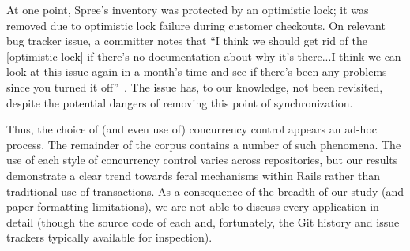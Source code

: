 At one point, Spree's inventory was protected by an optimistic lock;
it was removed due to optimistic lock failure during customer
checkouts. On relevant bug tracker issue, a committer notes that ``I
think we should get rid of the [optimistic lock] if there's no
documentation about why it's there...I think we can look at this issue
again in a month's time and see if there's been any problems since you
turned it off''~\cite{code-optimistic-issue}. The issue has, to our
knowledge, not been revisited, despite the potential dangers of
removing this point of synchronization.

Thus, the choice of (and even use of) concurrency control appears an
ad-hoc process. The remainder of the corpus contains a number of such
phenomena. The use of each style of concurrency control varies across
repositories, but our results demonstrate a clear trend towards feral
mechanisms within Rails rather than traditional use of
transactions. As a consequence of the breadth of our study (and paper
formatting limitations), we are not able to discuss every application
in detail (though the source code of each and, fortunately, the Git
history and issue trackers typically available for
inspection).

